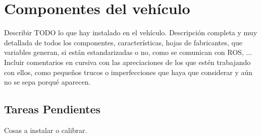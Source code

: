 \chapter{Componentes del vehículo}
Describir TODO lo que hay instalado en el vehículo. Descripción completa y muy detallada de todos los componentes, características, hojas de fabricantes, que variables generan, si están estandarizadas o no, como se comunican con ROS, ... Incluir comentarios en cursiva con las apreciaciones de los que estén trabajando con ellos, como pequeños trucos o imperfecciones que haya que considerar y aún no se sepa porqué aparecen.

\section{Tareas Pendientes}
Cosas a instalar o calibrar.
\afterpage{\blankpage}